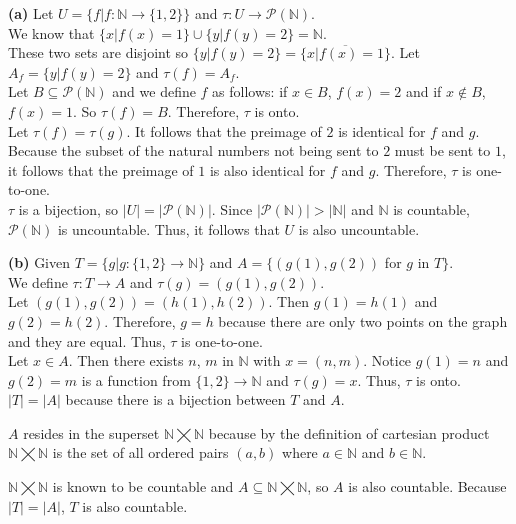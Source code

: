 \documentclass[11pt]{article}
\renewcommand\part[1]{\vspace{.10in}\textbf{(#1)}}
\begin{document}
\part{a} Let $U = \{f | f: \mathbb{N} \rightarrow \{1, 2\}\}$ and $\tau: U \rightarrow \mathcal{P}(\mathbb{N})$.\\[\baselineskip]

We know that $\{x | f(x) = 1\} \cup \{y | f(y) = 2\} = \mathbb{N}$.\\[\baselineskip]

These two sets are disjoint so $\{y | f(y) = 2\} = \overline{\{x | f(x) = 1\}}$. Let $A_f = \{y | f(y) = 2\}$ and $\tau(f) = A_f$. \\[\baselineskip]Let $B \subseteq \mathcal{P}(\mathbb{N})$ and we define $f$ as follows: if $x \in B$, $f(x) = 2$ and if $x \notin B$, $f(x) = 1$. So $\tau(f) = B$. Therefore, $\tau$ is onto.\\[\baselineskip] Let $\tau(f) = \tau(g)$. It follows that the preimage of $2$ is identical for $f$ and $g$. Because the subset of the natural numbers not being sent to $2$ must be sent to $1$, it follows that the preimage of $1$ is also identical for $f$ and $g$. Therefore, $\tau$ is one-to-one.\\[\baselineskip] $\tau$ is a bijection, so $|U| = |\mathcal{P}(\mathbb{N})|$. Since $|\mathcal{P}(\mathbb{N})| > |\mathbb{N}|$ and $\mathbb{N}$ is countable, $\mathcal{P}(\mathbb{N})$ is uncountable. Thus, it follows that $U$ is also uncountable.

\part{b} Given $T = \{g | g: \{1, 2\} \rightarrow \mathbb{N}\}$ and $A = \{(g(1), g(2))$ for $g$ in $T\}$.\\[\baselineskip] 

We define $\tau: T \rightarrow A$ and $\tau(g) = (g(1), g(2))$.\\[\baselineskip]

Let $(g(1), g(2)) = (h(1), h(2))$. Then $g(1) = h(1)$ and $g(2) = h(2)$. Therefore, $g = h$ because there are only two points on the graph and they are equal. Thus, $\tau$ is one-to-one.\\[\baselineskip]

Let $x \in A$. Then there exists $n$, $m$ in $\mathbb{N}$ with $x = (n, m)$. Notice $g(1) = n$ and $g(2) = m$ is a function from $\{1, 2\} \rightarrow \mathbb{N}$ and $\tau(g) = x$. Thus, $\tau$ is onto.\\[\baselineskip]

$|T| = |A|$ because there is a bijection between $T$ and $A$.

$A$ resides in the superset $\mathbb{N} \bigtimes \mathbb{N}$ because by the definition of cartesian product $\mathbb{N} \bigtimes \mathbb{N}$ is the set of all ordered pairs $(a, b)$ where $a \in \mathbb{N}$ and $b \in \mathbb{N}$.

$\mathbb{N} \bigtimes \mathbb{N}$ is known to be countable and $A \subseteq \mathbb{N} \bigtimes \mathbb{N}$, so $A$ is also countable. Because $|T| = |A|$, $T$ is also countable. 
\end{document}
